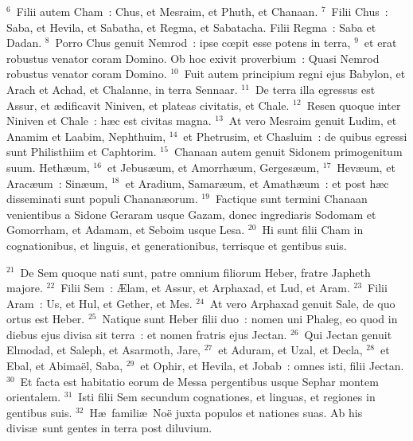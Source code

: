 ${}^{6}$~Filii autem Cham~: Chus, et Mesraim, et Phuth, et Chanaan.
${}^{7}$~Filii Chus~: Saba, et Hevila, et Sabatha, et Regma, et Sabatacha. Filii Regma~: Saba et Dadan.
${}^{8}$~Porro Chus genuit Nemrod~: ipse cœpit esse potens in terra,
${}^{9}$~et erat robustus venator coram Domino. Ob hoc exivit proverbium~: Quasi Nemrod robustus venator coram Domino.
${}^{10}$~Fuit autem principium regni ejus Babylon, et Arach et Achad, et Chalanne, in terra Sennaar.
${}^{11}$~De terra illa egressus est Assur, et \ae dificavit Niniven, et plateas civitatis, et Chale.
${}^{12}$~Resen quoque inter Niniven et Chale~: h\ae c est civitas magna.
${}^{13}$~At vero Mesraim genuit Ludim, et Anamim et Laabim, Nephthuim,
${}^{14}$~et Phetrusim, et Chasluim~: de quibus egressi sunt Philisthiim et Caphtorim.
${}^{15}$~Chanaan autem genuit Sidonem primogenitum suum. Heth\ae um,
${}^{16}$~et Jebus\ae um, et Amorrh\ae um, Gerges\ae um,
${}^{17}$~Hev\ae um, et Arac\ae um~: Sin\ae um,
${}^{18}$~et Aradium, Samar\ae um, et Amath\ae um~: et post h\ae c disseminati sunt populi Chanan\ae orum.
${}^{19}$~Factique sunt termini Chanaan venientibus a Sidone Geraram usque Gazam, donec ingrediaris Sodomam et Gomorrham, et Adamam, et Seboim usque Lesa.
${}^{20}$~Hi sunt filii Cham in cognationibus, et linguis, et generationibus, terrisque et gentibus suis.


${}^{21}$~De Sem quoque nati sunt, patre omnium filiorum Heber, fratre Japheth majore.
${}^{22}$~Filii Sem~: \AE lam, et Assur, et Arphaxad, et Lud, et Aram.
${}^{23}$~Filii Aram~: Us, et Hul, et Gether, et Mes.
${}^{24}$~At vero Arphaxad genuit Sale, de quo ortus est Heber.
${}^{25}$~Natique sunt Heber filii duo~: nomen uni Phaleg, eo quod in diebus ejus divisa sit terra~: et nomen fratris ejus Jectan.
${}^{26}$~Qui Jectan genuit Elmodad, et Saleph, et Asarmoth, Jare,
${}^{27}$~et Aduram, et Uzal, et Decla,
${}^{28}$~et Ebal, et Abima\"el, Saba,
${}^{29}$~et Ophir, et Hevila, et Jobab~: omnes isti, filii Jectan.
${}^{30}$~Et facta est habitatio eorum de Messa pergentibus usque Sephar montem orientalem.
${}^{31}$~Isti filii Sem secundum cognationes, et linguas, et regiones in gentibus suis.
${}^{32}$~H\ae\ famili\ae\ No\"e juxta populos et nationes suas. Ab his divis\ae\ sunt gentes in terra post diluvium.

